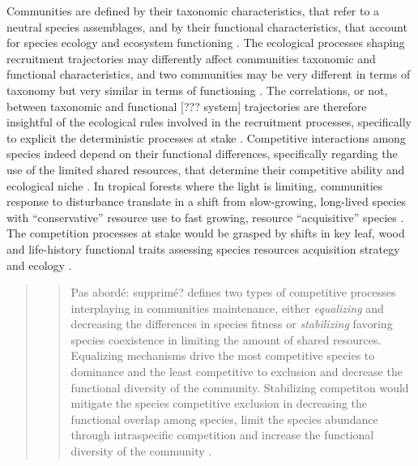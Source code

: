 \documentclass[fleqn,10pt]{ArtEcoFoG} %
\begin{document}
Communities are defined by their taxonomic characteristics, that refer
to a neutral species assemblages, and by their functional
characteristics, that account for species ecology and ecosystem
functioning \citep{Violle2007b, Kunstler2016}. The ecological processes
shaping recruitment trajectories may differently affect communities
taxonomic and functional characteristics, and two communities may be
very different in terms of taxonomy but very similar in terms of
functioning \citep{Villeger2012}. The correlations, or not, between
taxonomic and functional {[}??? system{]} trajectories are therefore
insightful of the ecological rules involved in the recruitment
processes, specifically to explicit the deterministic processes at stake
\citep{Mayfield2010, Fukami2005}. Competitive interactions among species
indeed depend on their functional differences, specifically regarding
the use of the limited shared resources, that determine their
competitive ability and ecological niche \citep{Webb2002, Perronne2017}.
In tropical forests where the light is limiting, communities response to
disturbance translate in a shift from slow-growing, long-lived species
with ``conservative'' resource use to fast growing, resource
``acquisitive'' species \citep{Denslow1980, Molino2001, Bongers2009}.\\
The competition processes at stake would be grasped by shifts in key
leaf, wood and life-history functional traits assessing species
resources acquisition strategy and ecology
\citep{Wright2004, Chave2009b, Herault2011, Gerhold2015}.

\begin{quote}
\begin{quote}
Pas abordé: supprimé? \citep{Chesson2000} defines two types of
competitive processes interplaying in communities maintenance, either
\emph{equalizing} and decreasing the differences in species fitness or
\emph{stabilizing} favoring species coexistence in limiting the amount
of shared resources. Equalizing mechanisms drive the most competitive
species to dominance and the least competitive to exclusion and decrease
the functional diversity of the community. Stabilizing competiton would
mitigate the species competitive exclusion in decreasing the functional
overlap among species, limit the species abundance through intraspecific
competition and increase the functional diversity of the community
\citep{Ackerly2003, McGill2006, Kunstler2012}.
\end{quote}
\end{quote}
\end{document}
